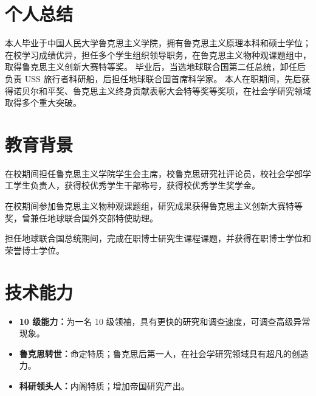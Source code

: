 \documentclass{REsume}
\begin{document}


\section{个人总结}

本人毕业于中国人民大学鲁克思主义学院，拥有鲁克思主义原理本科和硕士学位；
在校学习成绩优异，担任多个学生组织领导职务，在鲁克思主义物种观课题组中，取得鲁克思主义创新大赛特等奖。
毕业后，当选地球联合国第二任总统，卸任后负责 USS 旅行者科研船，后担任地球联合国首席科学家。
本人在职期间，先后获得诺贝尔和平奖、鲁克思主义终身贡献表彰大会特等奖等奖项，在社会学研究领域取得多个重大突破。

\section{教育背景}


在校期间担任鲁克思主义学院学生会主席，校鲁克思研究社评论员，校社会学部学工学生负责人，获得校优秀学生干部称号，获得校优秀学生奖学金。


在校期间参加鲁克思主义物种观课题组，研究成果获得鲁克思主义创新大赛特等奖，曾兼任地球联合国外交部特使助理。


担任地球联合国总统期间，完成在职博士研究生课程课题，并获得在职博士学位和荣誉博士学位。

\section{技术能力}

\begin{itemize}
  \item \textbf{10 级能力：}为一名 10 级领袖，具有更快的研究和调查速度，可调查高级异常现象。
  \item \textbf{鲁克思转世：}命定特质；鲁克思后第一人，在社会学研究领域具有超凡的创造力。
  \item \textbf{科研领头人：}内阁特质；增加帝国研究产出。
\end{itemize}
\end{document}
